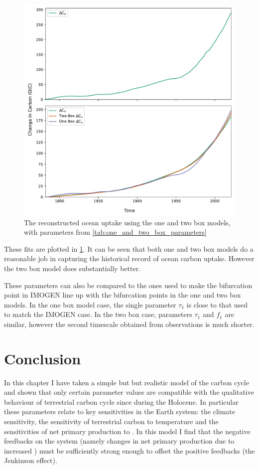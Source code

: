 \begin{figure}
  \centering
  \includegraphics[keepaspectratio,width=\textwidth]{gcb_ocean_atmosphere_boxes}
  \caption{The reconstructed ocean uptake using the one and two box models, with parameters from \cref{tab:one_and_two_box_parameters}}
  \label{fig:fits_from_one_and_two}
\end{figure}

These fits are plotted in \cref{fig:fits_from_one_and_two}. It can be seen that both one and two box models do a reasonable job in capturing the
historical record of ocean carbon uptake. However the two box model does substantially better.

These parameters can also be compared to the ones used to make the bifurcation point in IMOGEN line up with the bifurcation points in the one and two box models. In the one box model case,
the single parameter $\tau_1$ is close to that used to match the IMOGEN case. In the two box case, parameters $\tau_1$ and $f_1$ are similar, however the second timescale obtained from observations
is much shorter.

\section{Conclusion}
In this chapter I have taken a simple but but realistic model of the carbon cycle and shown that only certain parameter values are compatible with the qualitative behaviour
of terrestrial carbon cycle since during the Holocene. In particular these parameters relate to key sensitivities in the Earth system: the climate sensitivity, the sensitivity of
terrestrial carbon to temperature and the sensitivities of net primary production to . In this model I find that the negative feedbacks on the system (namely changes in net primary
production due to increased ) must be sufficiently strong enough to offset the positive feedbacks (the Jenkinson effect).

